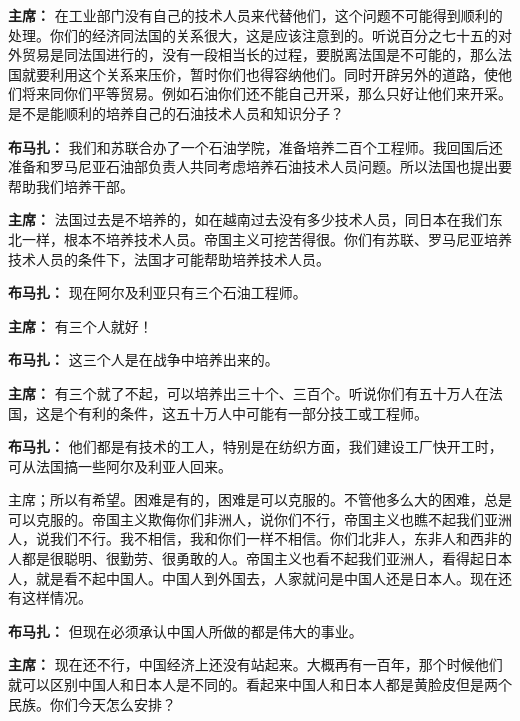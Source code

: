 \begin{duihua}
\item[\textbf{主席：}] 在工业部门没有自己的技术人员来代替他们，这个问题不可能得到顺利的处理。你们的经济同法国的关系很大，这是应该注意到的。听说百分之七十五的对外贸易是同法国进行的，没有一段相当长的过程，要脱离法国是不可能的，那么法国就要利用这个关系来压价，暂时你们也得容纳他们。同时开辟另外的道路，使他们将来同你们平等贸易。例如石油你们还不能自己开采，那么只好让他们来开采。是不是能顺利的培养自己的石油技术人员和知识分子？

\item[\textbf{布马扎：}] 我们和苏联合办了一个石油学院，准备培养二百个工程师。我回国后还准备和罗马尼亚石油部负责人共同考虑培养石油技术人员问题。所以法国也提出要帮助我们培养干部。

\item[\textbf{主席：}] 法国过去是不培养的，如在越南过去没有多少技术人员，同日本在我们东北一样，根本不培养技术人员。帝国主义可挖苦得很。你们有苏联、罗马尼亚培养技术人员的条件下，法国才可能帮助培养技术人员。

\item[\textbf{布马扎：}] 现在阿尔及利亚只有三个石油工程师。

\item[\textbf{主席：}] 有三个人就好！

\item[\textbf{布马扎：}] 这三个人是在战争中培养出来的。

\item[\textbf{主席：}] 有三个就了不起，可以培养出三十个、三百个。听说你们有五十万人在法国，这是个有利的条件，这五十万人中可能有一部分技工或工程师。

\item[\textbf{布马扎：}] 他们都是有技术的工人，特别是在纺织方面，我们建设工厂快开工时，可从法国搞一些阿尔及利亚人回来。

主席；所以有希望。困难是有的，困难是可以克服的。不管他多么大的困难，总是可以克服的。帝国主义欺侮你们非洲人，说你们不行，帝国主义也瞧不起我们亚洲人，说我们不行。我不相信，我和你们一样不相信。你们北非人，东非人和西非的人都是很聪明、很勤劳、很勇敢的人。帝国主义也看不起我们亚洲人，看得起日本人，就是看不起中国人。中国人到外国去，人家就问是中国人还是日本人。现在还有这样情况。

\item[\textbf{布马扎：}] 但现在必须承认中国人所做的都是伟大的事业。

\item[\textbf{主席：}] 现在还不行，中国经济上还没有站起来。大概再有一百年，那个时候他们就可以区别中国人和日本人是不同的。看起来中国人和日本人都是黄脸皮但是两个民族。你们今天怎么安排？


\end{duihua}

